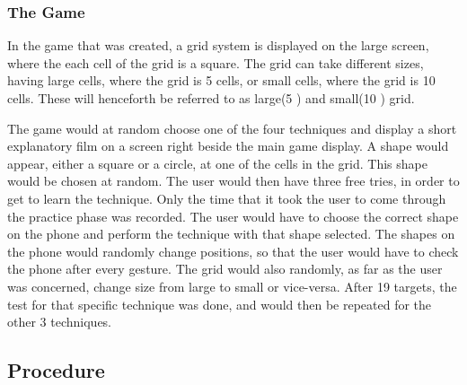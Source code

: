 \subsubsection{The Game}


In the game that was created, a grid system is displayed on the large screen, where the each cell of the grid is a square. The grid can take different sizes, having large cells, where the grid is 5  cells, or small cells, where the grid is 10  cells. These will henceforth be referred to as large(5 ) and small(10 ) grid.

The game would at random choose one of the four techniques and display a short explanatory film on a screen right beside the main game display. A shape would appear, either a square or a circle, at one of the cells in the grid. This shape would be chosen at random. The user would then have three free tries, in order to get to learn the technique. Only the time that it took the user to come through the practice phase was recorded. The user would have to choose the correct shape on the phone and perform the technique with that shape selected. The shapes on the phone would randomly change positions, so that the user would have to check the phone after every gesture. The grid would also randomly, as far as the user was concerned, change size from large to small or vice-versa. After 19 targets, the test for that specific technique was done, and would then be repeated for the other 3 techniques. 

\subsection{Procedure}


